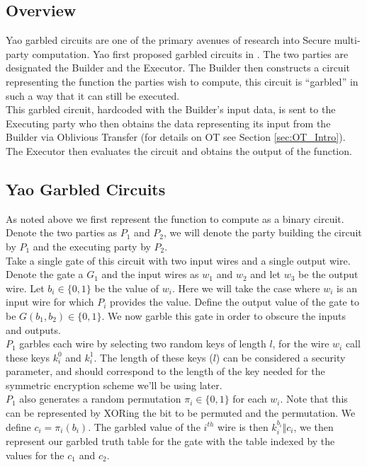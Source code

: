 \documentclass[ %
                    author={Nicholas Tutte},
                supervisor={Prof. Nigel Smart},
                    degree={MEng},
                     title={Secure Two Party Computation},
                  subtitle={A practical comparison of recent protocols},
                      type={Research - GG1K},
                      year={2015} ]{dissertation}
\begin{document}
		\subsection{Overview} \label{sub:Yao_Overview}
			Yao garbled circuits are one of the primary avenues of research into Secure multi-party computation. Yao first proposed garbled circuits in \cite{YaoOriginal}. The two parties are designated the Builder and the Executor. The Builder then constructs a circuit representing the function the parties wish to compute, this circuit is ``garbled'' in such a way that it can still be executed.\\

			This garbled circuit, hardcoded with the Builder's input data, is sent to the Executing party who then obtains the data representing its input from the Builder via Oblivious Transfer (for details on OT see Section  \ref{sec:OT_Intro}). The Executor then evaluates the circuit and obtains the output of the function.


		\subsection{Yao Garbled Circuits} \label{sub:Yao_Details}
			As noted above we first represent the function to compute as a binary circuit. Denote the two parties as $P_1$ and $P_2$, we will denote the party building the circuit by $P_1$ and the executing party by $P_2$.\\
			
			Take a single gate of this circuit with two input wires and a single output wire. Denote the gate a $G_1$ and the input wires as $w_1$ and $w_2$ and let $w_3$ be the output wire. Let $b_i \in \{0, 1\}$ be the value of $w_i$. Here we will take the case where $w_i$ is an input wire for which $P_i$ provides the value. Define the output value of the gate to be $G(b_1, b_2) \in \{0, 1\}$. We now garble this gate in order to obscure the inputs and outputs.\\

			$P_1$ garbles each wire by selecting two random keys of length $l$, for the wire $w_i$ call these keys $k_i^0$ and $k_i^1$. The length of these keys ($l$) can be considered a security parameter, and should correspond to the length of the key needed for the symmetric encryption scheme we'll be using later.\\

			$P_1$ also generates a random permutation $\pi_i \in \{0, 1\}$ for each $w_i$. Note that this can be represented by XORing the bit to be permuted and the permutation. We define $c_i = \pi_i(b_i)$. The garbled value of the $i^{th}$ wire is then $k_i^{b_i} \Vert c_i$, we then represent our garbled truth table for the gate with the table indexed by the values for the $c_1$ and $c_2$.
\end{document}
